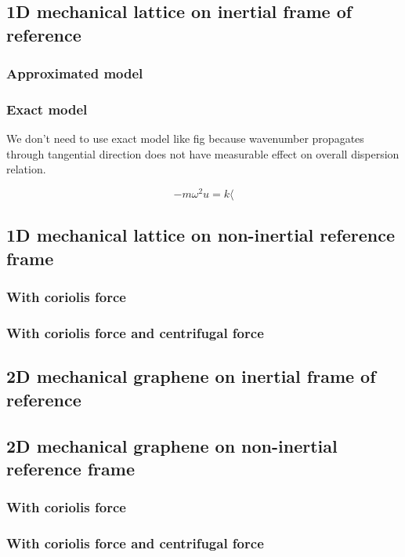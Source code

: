\documentclass[../main.tex]{subfiles}
\begin{document}
\subsection{1D mechanical lattice on inertial frame of reference}

\subsubsection{Approximated model}

\subsubsection{Exact model}

We don't need to use exact model like fig because wavenumber propagates
through tangential direction does not have measurable effect on
overall dispersion relation.

$$
-m\omega^2 u = k \langle 
$$

\subsection{1D mechanical lattice on non-inertial reference frame}

\subsubsection{With coriolis force}

\subsubsection{With coriolis force and centrifugal force}

\subsection{2D mechanical graphene on inertial frame of reference}

\subsection{2D mechanical graphene on non-inertial reference frame}

\subsubsection{With coriolis force}

\subsubsection{With coriolis force and centrifugal force}
\end{document}
